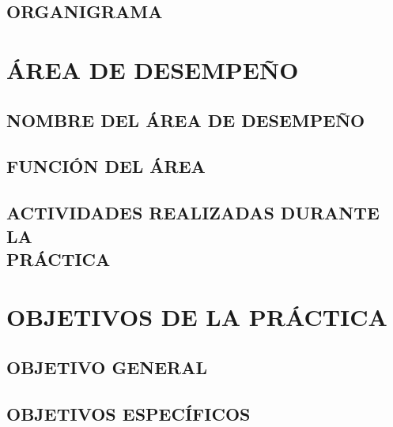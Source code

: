 \subsection{ORGANIGRAMA}

\section{ÁREA DE DESEMPEÑO}

\subsection{NOMBRE DEL ÁREA DE DESEMPEÑO}
\subsection{FUNCIÓN DEL ÁREA}
\subsection[ACTIVIDADES REALIZADAS DURANTE LA PRÁCTICA]{ACTIVIDADES REALIZADAS DURANTE LA\\ PRÁCTICA}

\section{OBJETIVOS DE LA PRÁCTICA}

\subsection{OBJETIVO GENERAL}
\subsection{OBJETIVOS ESPECÍFICOS}